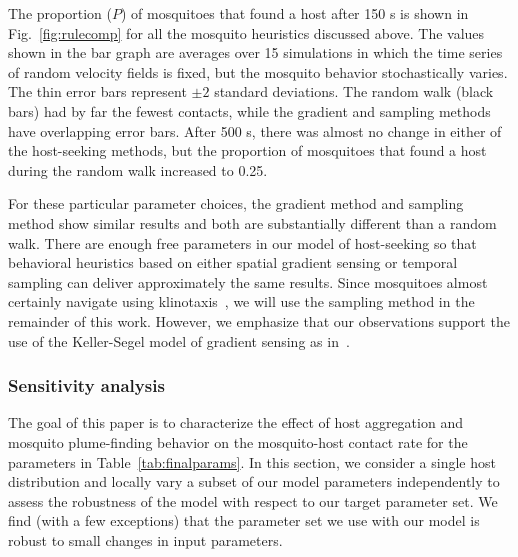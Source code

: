 \documentclass[10pt]{article}
\begin{document}
The proportion ($P$) of mosquitoes that found a host after 150 s is shown in Fig.~\ref{fig:rulecomp} for all the mosquito heuristics discussed above. The values shown in the bar graph are averages over 15 simulations in which the time series of random velocity fields is fixed, but the mosquito behavior stochastically varies. The thin error bars represent $\pm 2$ standard deviations. The random walk (black bars) had by far the fewest contacts, while the gradient and sampling methods have overlapping error bars. After 500 s, there was almost no change in either of the host-seeking methods, but the proportion of mosquitoes that found a host during the random walk increased to 0.25. 

For these particular parameter choices, the gradient method and sampling method show similar results and both are substantially different than a random walk. There are enough free parameters in our model of host-seeking so that behavioral heuristics based on either spatial gradient sensing or temporal sampling can deliver approximately the same results. Since mosquitoes almost certainly navigate using klinotaxis~\cite{Carde1996}, we will use the sampling method in the remainder of this work. However, we emphasize that our observations support the use of the Keller-Segel model of gradient sensing as in~\cite{KellerSegel,Horstmann}.


\subsubsection*{Sensitivity analysis}\label{sec:SA}
The goal of this paper is to characterize the effect of host aggregation and mosquito plume-finding behavior on the mosquito-host contact rate for the parameters in Table~\ref{tab:finalparams}. In this section, we consider a single host distribution and locally vary a subset of our model parameters independently to assess the robustness of the model with respect to our target parameter set. We find (with a few exceptions) that the parameter set we use with our model is robust to small changes in input parameters. 
\end{document}
